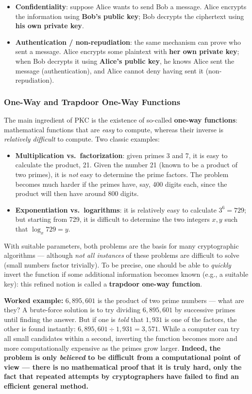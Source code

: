\documentclass[12pt, a4paper]{article}
\begin{document}
\begin{itemize}
    \item \textbf{Confidentiality}: suppose Alice wants to send Bob a message. Alice encrypts the information using \textbf{Bob's public key}; Bob decrypts the ciphertext using \textbf{his own private key}.
    \item \textbf{Authentication / non-repudiation}: the same mechanism can prove who sent a message. Alice encrypts some plaintext with \textbf{her own private key}; when Bob decrypts it using \textbf{Alice's public key}, he knows Alice sent the message (authentication), and Alice cannot deny having sent it (non-repudiation).
\end{itemize}

\subsubsection{One-Way and Trapdoor One-Way Functions}
The main ingredient of PKC is the existence of so-called \textbf{one-way functions}: mathematical functions that are \emph{easy} to compute, whereas their inverse is \emph{relatively difficult} to compute. Two classic examples:
\begin{itemize}
    \item \textbf{Multiplication vs.\ factorization}: given primes 3 and 7, it is easy to calculate the product, 21. Given the number 21 (known to be a product of two primes), it is \emph{not} easy to determine the prime factors. The problem becomes much harder if the primes have, say, 400 digits each, since the product will then have around 800 digits.
    \item \textbf{Exponentiation vs.\ logarithms}: it is relatively easy to calculate $3^6=729$; but starting from 729, it is difficult to determine the two integers $x,y$ such that $\log_x 729 = y$.
\end{itemize}
With suitable parameters, both problems are the basis for many cryptographic algorithms --- although \emph{not all instances} of these problems are difficult to solve (small numbers factor trivially). To be precise, one should be able to \emph{quickly} invert the function if some additional information becomes known (e.g., a suitable key): this refined notion is called a \textbf{trapdoor one-way function}.

\textbf{Worked example:} $6{,}895{,}601$ is the product of two prime numbers --- what are they? A brute-force solution is to try dividing $6{,}895{,}601$ by successive primes until finding the answer. But if one is \emph{told} that $1{,}931$ is one of the factors, the other is found instantly: $6{,}895{,}601 \div 1{,}931 = 3{,}571$. While a computer can try all small candidates within a second, inverting the function becomes more and more computationally expensive as the primes grow larger. \textcolor{blue!50!black}{\textbf{Indeed, the problem is only \emph{believed} to be difficult from a computational point of view --- there is no mathematical proof that it is truly hard, only the fact that repeated attempts by cryptographers have failed to find an efficient general method.}}
\end{document}
